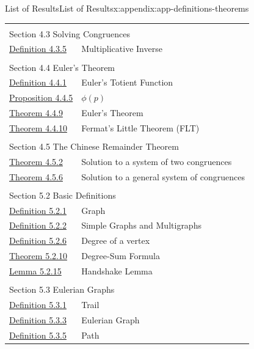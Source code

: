 \documentclass[oneside,10pt,]{book}
\numberwithin{equation}{section}
\begin{document}
\begin{appendixptx}{List of Results}{}{List of Results}{}{}{x:appendix:app-definitions-theorems}
\begin{longtable}[l]{ll}
\multicolumn{2}{l}{\null}\\[1.5ex] \multicolumn{2}{l}{\large Section 4.3 Solving Congruences}\\[0.5ex]
\hyperref[x:definition:def-multiplicative-inverse]{Definition 4.3.5}& Multiplicative Inverse\\
\multicolumn{2}{l}{\null}\\[1.5ex] \multicolumn{2}{l}{\large Section 4.4 Euler's Theorem}\\[0.5ex]
\hyperref[x:definition:def-euler-totient]{Definition 4.4.1}& Euler's Totient Function\\
\hyperref[x:proposition:prop-euler-totient-prime]{Proposition 4.4.5}& \(\phi(p)\)\\
\hyperref[x:theorem:thm-euler]{Theorem 4.4.9}& Euler's Theorem\\
\hyperref[x:theorem:thm-flt]{Theorem 4.4.10}& Fermat's Little Theorem (FLT)\\
\multicolumn{2}{l}{\null}\\[1.5ex] \multicolumn{2}{l}{\large Section 4.5 The Chinese Remainder Theorem}\\[0.5ex]
\hyperref[x:theorem:thm-crt-2]{Theorem 4.5.2}& Solution to a system of two congruences\\
\hyperref[x:theorem:thm-crt-n]{Theorem 4.5.6}& Solution to a general system of congruences\\
\multicolumn{2}{l}{\null}\\[1.5ex] \multicolumn{2}{l}{\large Section 5.2 Basic Definitions}\\[0.5ex]
\hyperref[x:definition:def-graph]{Definition 5.2.1}& Graph\\
\hyperref[x:definition:def-graph-simple]{Definition 5.2.2}& Simple Graphs and Multigraphs\\
\hyperref[x:definition:def-degree]{Definition 5.2.6}& Degree of a vertex\\
\hyperref[x:theorem:thm-degree-sum]{Theorem 5.2.10}& Degree-Sum Formula\\
\hyperref[x:lemma:lemma-handshake]{Lemma 5.2.15}& Handshake Lemma\\
\multicolumn{2}{l}{\null}\\[1.5ex] \multicolumn{2}{l}{\large Section 5.3 Eulerian Graphs}\\[0.5ex]
\hyperref[x:definition:def-trail]{Definition 5.3.1}& Trail\\
\hyperref[x:definition:def-eulerian]{Definition 5.3.3}& Eulerian Graph\\
\hyperref[x:definition:def-path]{Definition 5.3.5}& Path\\

\end{longtable}
\end{appendixptx}
\end{document}
